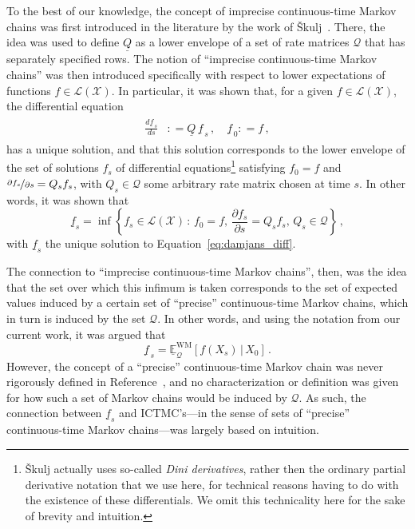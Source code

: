 \documentclass[10pt,a4paper]{paper}
\theoremstyle{definition}
\newcommand{\reals}{\mathbb{R}}
\newcommand{\realsnonneg}{\reals_{\geq 0}}
\newcommand{\states}{\mathcal{X}}
\newcommand{\gambles}{\mathcal{L}}
\newcommand{\gamblesX}{\gambles(\states)}
\newcommand{\rateset}{\mathcal{Q}}
\newcommand{\lrate}{\underline{Q}}
\newcommand{\coloneqq}{:\!=}
\newcommand{\ictmc}{{ICTMC}}
\begin{document}

To the best of our knowledge, the concept of imprecise continuous-time Markov chains was first introduced in the literature by the work of {\v{S}}kulj~\cite{Skulj:2015cq}. There, the idea was used to define $\lrate$ as a lower envelope of a set of rate matrices $\rateset$ that has separately specified rows. The notion of ``imprecise continuous-time Markov chains'' was then introduced specifically with respect to lower expectations of functions $f\in\gamblesX$. In particular, it was shown that, for a given $f\in\gamblesX$, the differential equation
\begin{align}\label{eq:damjans_diff}
\begin{split}
\frac{d \underline{f}_{\,s}}{d s} &\coloneqq \lrate\,\underline{f}_{\,s}\,,\quad
\underline{f}_{\,0} \coloneqq f\,,
\end{split}
\end{align}
has a unique solution, and that this solution corresponds to the lower envelope of the set of solutions $f_s$ of differential equations\footnote{{\v{S}}kulj actually uses so-called \emph{Dini derivatives}, rather then the ordinary partial derivative notation that we use here, for technical reasons having to do with the existence of these differentials. We omit this technicality here for the sake of brevity and intuition.} satisfying $f_0=f$ and $\nicefrac{\partial f_s}{\partial s}=Q_s f_s$, %
with $Q_s\in\rateset$ some arbitrary rate matrix chosen at time $s$. In other words, it was shown that
\begin{equation*}
\underline{f}_s = \inf\left\{ f_s\in\gamblesX\,:\, f_0=f,\, \frac{\partial f_s}{\partial s}=Q_s f_s, \,Q_s\in\rateset \right\}\,,
\end{equation*}
with $\underline{f}_s$ the unique solution to Equation~\eqref{eq:damjans_diff}. 

The connection to ``imprecise continuous-time Markov chains'', then, was the idea that the set over which this infimum is taken corresponds to the set of expected values induced by a certain set of ``precise'' continuous-time Markov chains, which in turn is induced by the set $\rateset$. In other words, and using the notation from our current work, it was argued that
\begin{equation}\label{eq:damjans_lower}
\underline{f}_{\,s} = \underline{\mathbb{E}}_{\rateset}^{\mathrm{WM}}[f(X_s)\,\vert\,X_0]\,.
\end{equation}
However, the concept of a ``precise'' continuous-time Markov chain was never rigorously defined in Reference~\cite{Skulj:2015cq}, and no characterization or definition was given for how such a set of Markov chains would be induced by $\rateset$. As such, the connection between $\underline{f}_s$ and \ictmc's---in the sense of sets of ``precise'' continuous-time Markov chains---was largely based on intuition.
\end{document}
